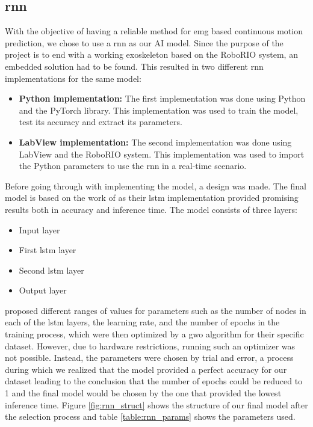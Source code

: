 \subsection{\acrfull{rnn}}
With the objective of having a reliable method for \acrshort{emg} based continuous motion prediction, we chose to 
use a \acrshort{rnn} as our AI model. Since the purpose of the project is to end with a working exoskeleton based 
on the RoboRIO system, an embedded solution had to be found. This resulted in two different \acrshort{rnn} 
implementations for the same model:
\begin{itemize}

    \item \textbf{Python implementation:} The first implementation was done using Python and the PyTorch library. 
    This implementation was used to train the model, test its accuracy and extract its parameters.
    
    \item \textbf{LabView implementation:} The second implementation was done using LabView and the RoboRIO system. 
    This implementation was used to import the Python parameters to use the \acrshort{rnn} in a real-time scenario.

\end{itemize}

Before going through with implementing the model, a design was made. The final model is based on the work of \cite{RNNEMG} 
as their \acrfull{lstm} implementation provided promising results both in accuracy and inference time. The model consists 
of three layers:
\begin{itemize}

    \item Input layer

    \item First \acrshort{lstm} layer

    \item Second \acrshort{lstm} layer
    
    \item Output layer

\end{itemize}

\cite{RNNEMG} proposed different ranges of values for parameters such as the number of nodes in each of the \acrshort{lstm} 
layers, the learning rate, and the number of epochs in the training process, which were then optimized by a \acrfull{gwo} 
algorithm for their specific dataset. However, due to hardware restrictions, running such an optimizer was not possible. Instead, 
the parameters were chosen by trial and error, a process during which we realized that the model provided a perfect accuracy 
for our dataset leading to the conclusion that the number of epochs could be reduced to 1 and the final model would be chosen 
by the one that provided the lowest inference time. Figure \ref{fig:rnn_struct} shows the structure of our final model after 
the selection process and table \ref{table:rnn_params} shows the parameters used.

